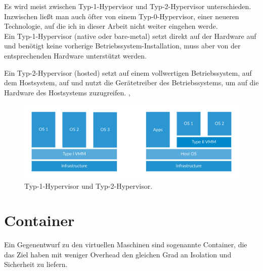 \noindent Es wird meist zwischen Typ-1-Hypervisor und Typ-2-Hypervisor unterschieden. Inzwischen ließt man auch öfter von einem Typ-0-Hypervisor, einer neueren Technologie, auf die ich in dieser Arbeit nicht weiter eingehen werde.\\

\noindent Ein Typ-1-Hypervisor (native oder bare-metal) setzt direkt auf der Hardware auf und benötigt keine vorherige Betriebssystem-Installation, muss aber von der entsprechenden Hardware unterstützt werden.

\vspace{\baselineskip}

\noindent Ein Typ-2-Hypervisor (hosted) setzt auf einem vollwertigen Betriebssystem, auf dem Hostsystem, auf und nutzt die Gerätetreiber des Betriebssystems, um auf die Hardware des Hostsystems zuzugreifen. \cite{wiki:hyper}, \cite{6903537}\\

\begin{figure}[!ht] %
  \centering
  \includegraphics[width=1\textwidth]{images/2-hypervisors.png}
  \caption{Typ-1-Hypervisor und Typ-2-Hypervisor. \cite{wiki:hyper}}
\end{figure}


\section{Container}
Ein Gegenentwurf zu den virtuellen Maschinen sind sogenannte Container, die das Ziel haben mit weniger Overhead den gleichen Grad an Isolation und Sicherheit zu liefern.

